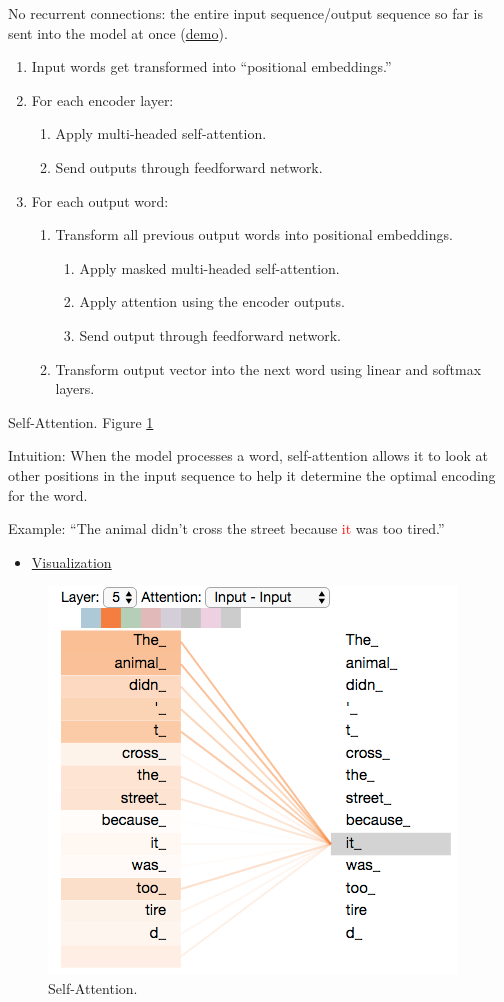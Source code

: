 \documentclass[english]{article}
\begin{document}
No recurrent connections: the entire input sequence/output sequence so far is sent into the model at once (\href{https://ai.googleblog.com/2017/08/transformer-novel-neural-network.html}{demo}).
 
\begin{enumerate}
\item Input words get transformed into ``positional embeddings.''
\item For each encoder layer:
\begin{enumerate}
\item Apply multi-headed self-attention.
\item Send outputs through feedforward network.
\end{enumerate}
\item For each output word:
\begin{enumerate}
\item Transform all previous output words into positional embeddings.
\begin{enumerate}
\item Apply masked multi-headed self-attention.
\item Apply attention using the encoder outputs.
\item Send output through feedforward network.
\end{enumerate}
\item Transform output vector into the next word using linear and softmax layers.
\end{enumerate}
\end{enumerate}
 

\item 
 {Self-Attention}.  Figure \ref{Self-Attention}

Intuition: When the model processes a word, self-attention allows it to look at other positions in the input sequence to help it determine the optimal encoding for the word.
 
Example: ``The animal didn't cross the street because \textcolor{red}{it} was too tired.''
\begin{itemize}
\item
\href{https://colab.research.google.com/github/tensorflow/tensor2tensor/blob/master/tensor2tensor/notebooks/hello_t2t.ipynb}{Visualization}
\end{itemize}
\begin{figure}
\centering
\includegraphics[height=0.4\linewidth]{self-attention.png}
    \caption{Self-Attention.}
    \label{Self-Attention}
\end{figure}
 
\end{document}
